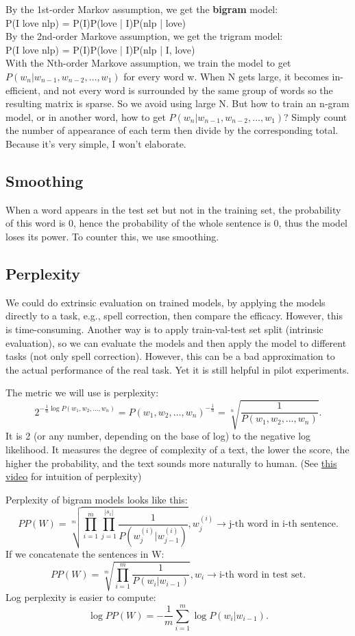\documentclass{report}
\begin{document}
\noindent By the 1st-order Markov assumption, we get the \textbf{bigram} model:\\

{\center P(I love nlp) = P(I)P(love | I)P(nlp | love)}\\

\noindent By the 2nd-order Markove assumption, we get the trigram model:\\

{\center P(I love nlp) = P(I)P(love | I)P(nlp | I, love)}\\

\noindent With the Nth-order Markove assumption, we train the model to get $P(w_n | w_{n-1}, w_{n-2}, \ldots, w_1)$ for every word w. When N gets large, it becomes in-efficient, and not every word is surrounded by the same group of words so the resulting matrix is sparse. So we avoid using large N. But how to train an n-gram model, or in another word, how to get $P(w_n | w_{n-1}, w_{n-2}, \ldots, w_1)$? Simply count the number of appearance of each term then divide by the corresponding total. Because it's very simple, I won't elaborate.

\subsection{Smoothing}
When a word appears in the test set but not in the training set, the probability of this word is 0, hence the probability of the whole sentence is 0, thus the model loses its power. To counter this, we use smoothing.

\subsection{Perplexity}
We could do extrinsic evaluation on trained models, by applying the models directly to a task, e.g., spell correction, then compare the efficacy. However, this is time-consuming. Another way is to apply train-val-test set split (intrinsic evaluation), so we can evaluate the models and then apply the model to different tasks (not only spell correction). However, this can be a bad approximation to the actual performance of the real task. Yet it is still helpful in pilot experiments.

The metric we will use is perplexity: \[
2^{-\frac{1}{n} \log P(w_1, w_2, \ldots, w_n)} = P(w_1, w_2, \ldots, w_n)^{-\frac{1}{n}} = \sqrt[n]{\frac{1}{P(w_1,w_2,\ldots,w_n)}} 
.\] It is 2 (or any number, depending on the base of log) to the negative log likelihood. It measures the degree of complexity of a text, the lower the score, the higher the probability, and the text sounds more naturally to human. (See \href{https://www.youtube.com/watch?v=NCyCkgMLRiY}{this video} for intuition of perplexity)

Perplexity of bigram models looks like this: \[
	PP(W) = \sqrt[m]{\prod_{i=1}^{m} \prod_{j=1}^{|s_i|} \frac{1}{P(w^{(i)}_j|w^{(i)}_{j-1} )}  }, w^{(i)}_j \to \text{j-th word in i-th sentence}
.\] 
If we concatenate the sentences in W: \[
	PP(W) = \sqrt[m]{\prod_{i=1}^{m} \frac{1}{P(w_i | w_{i-1}) }}, w_i \to \text{i-th word in test set}
.\] 
Log perplexity is easier to compute: \[
	\log PP(W) = -\frac{1}{m} \sum_{i=1}^{m} \log P(w_i | w_{i-1})
.\] 
\end{document}
